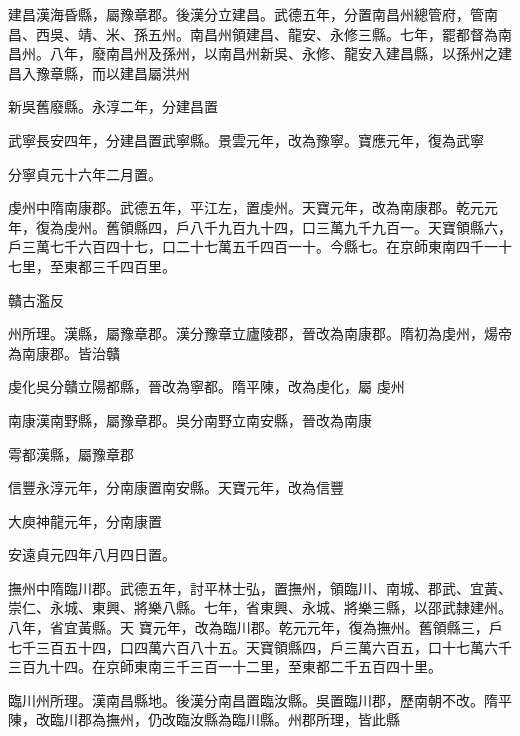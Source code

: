 \begin{pinyinscope}
 建昌漢海昏縣，屬豫章郡。後漢分立建昌。武德五年，分置南昌州總管府，管南昌、西吳、靖、米、孫五州。南昌州領建昌、龍安、永修三縣。七年，罷都督為南昌州。八年，廢南昌州及孫州，以南昌州新吳、永修、龍安入建昌縣，以孫州之建昌入豫章縣，而以建昌屬洪州



 新吳舊廢縣。永淳二年，分建昌置



 武寧長安四年，分建昌置武寧縣。景雲元年，改為豫寧。寶應元年，復為武寧



 分寧貞元十六年二月置。



 虔州中隋南康郡。武德五年，平江左，置虔州。天寶元年，改為南康郡。乾元元年，復為虔州。舊領縣四，戶八千九百九十四，口三萬九千九百一。天寶領縣六，戶三萬七千六百四十七，口二十七萬五千四百一十。今縣七。在京師東南四千一十七里，至東都三千四百里。



 贛古濫反



 州所理。漢縣，屬豫章郡。漢分豫章立廬陵郡，晉改為南康郡。隋初為虔州，煬帝為南康郡。皆治贛



 虔化吳分贛立陽都縣，晉改為寧都。隋平陳，改為虔化，屬
 虔州



 南康漢南野縣，屬豫章郡。吳分南野立南安縣，晉改為南康



 雩都漢縣，屬豫章郡



 信豐永淳元年，分南康置南安縣。天寶元年，改為信豐



 大庾神龍元年，分南康置



 安遠貞元四年八月四日置。



 撫州中隋臨川郡。武德五年，討平林士弘，置撫州，領臨川、南城、郡武、宜黃、崇仁、永城、東興、將樂八縣。七年，省東興、永城、將樂三縣，以邵武隸建州。八年，省宜黃縣。天
 寶元年，改為臨川郡。乾元元年，復為撫州。舊領縣三，戶七千三百五十四，口四萬六百八十五。天寶領縣四，戶三萬六百五，口十七萬六千三百九十四。在京師東南三千三百一十二里，至東都二千五百四十里。



 臨川州所理。漢南昌縣地。後漢分南昌置臨汝縣。吳置臨川郡，歷南朝不改。隋平陳，改臨川郡為撫州，仍改臨汝縣為臨川縣。州郡所理，皆此縣




\end{pinyinscope}
